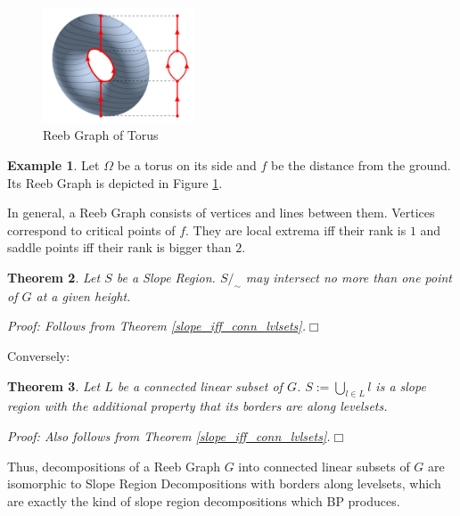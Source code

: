 \documentclass[a4paper,12pt,notitlepage,fullpage]{paper}
\theoremstyle{plain}
\newtheorem{thm}{Theorem}[section] %
\theoremstyle{definition}
\newtheorem{exmp}[thm]{Example} %
\begin{document}
\begin{figure}
\centering
\includegraphics[width=0.4\textwidth]{img/Reebgraph.png}
\caption{Reeb Graph of Torus}
\label{fig:reeb_torus}
\end{figure}

\begin{exmp}
Let $\Omega$ be a torus on its side and $f$ be the distance from the ground. Its Reeb Graph is depicted in Figure \ref{fig:reeb_torus}.
\end{exmp}

In general, a Reeb Graph consists of vertices and lines between them. Vertices correspond to critical points of $f$. They are local extrema iff their rank is $1$ and saddle points iff their rank is bigger than $2$.

\begin{thm}
Let $S$ be a Slope Region. $S/_\sim$ may intersect no more than one point of $G$ at a given height.

\emph{Proof:} Follows from Theorem \ref{slope_iff_conn_lvlsets}.\hfill $\Box$
\end{thm}

Conversely:

\begin{thm}
Let $L$ be a connected linear subset of $G$. $S := \bigcup_{l \in L} l$ is a slope region with the additional property that its borders are along levelsets.

\emph{Proof:} Also follows from Theorem \ref{slope_iff_conn_lvlsets}.\hfill $\Box$
\end{thm}

Thus, decompositions of a Reeb Graph $G$ into connected linear subsets of $G$ are isomorphic to Slope Region Decompositions with borders along levelsets, which are exactly the kind of slope region decompositions which BP produces.
\end{document}
